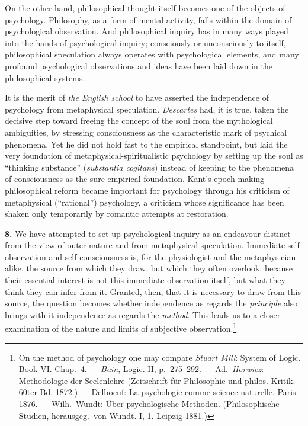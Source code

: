 \documentclass[12pt,a4paper]{book}
\begin{document}
On the other hand, philosophical thought itself becomes one of the
objects of psychology. Philosophy, as a form of mental activity, falls
within the domain of psychological observation. And philosophical
inquiry has in many ways played into the hands of psychological inquiry;
consciously or unconsciously to itself, philosophical speculation always
operates with psychological elements, and many profound psychological
observations and ideas have been laid down in the philosophical systems.

It is the merit of \emph{the English school} to have asserted the
independence of psychology from metaphysical speculation.
\emph{Descartes} had, it is true, taken the decisive step toward freeing
the concept of the soul from the mythological ambiguities, by stressing
consciousness as the characteristic mark of psychical phenomena. Yet he
did not hold fast to the empirical standpoint, but laid the very
foundation of metaphysical-spiritualistic psychology by setting up the
soul as ``thinking substance'' (\textit{substantia cogitans}) instead of
keeping to the phenomena of consciousness as the sure empirical
foundation. Kant's epoch-making philosophical reform became important for
psychology through his criticism of metaphysical (``rational'')
psychology, a criticism whose significance has been shaken only
temporarily by romantic attempts at restoration.

\textbf{8.} We have attempted to set up psychological inquiry as an
endeavour distinct from the view of outer nature and from metaphysical
speculation. Immediate self-observation and self-consciousness is, for
the physiologist and the metaphysician alike, the source from which they
draw, but which they often overlook, because their essential interest is
not this immediate observation itself, but what they think they can
infer from it. Granted, then, that it is necessary to draw from this
source, the question becomes whether independence as regards the
\emph{principle} also brings with it independence as regards the
\emph{method}. This leads us to a closer examination of the nature and
limits of subjective observation.\footnote{On the method of psychology
one may compare \emph{Stuart Mill}: System of Logic. Book VI. Chap.~4.
--- \emph{Bain}, Logic. II, p.~275--292. --- Ad.\ \emph{Horwicz}:
Methodologie der Seelenlehre (Zeitschrift für Philosophie und philos.
Kritik. 60ter Bd. 1872.) --- Delboeuf: La psychologie comme science
naturelle. Paris 1876. --- Wilh.\ Wundt: Über psychologische Methoden.
(Philosophische Studien, herausgeg.\ von Wundt. I, 1. Leipzig 1881.)}
\end{document}
